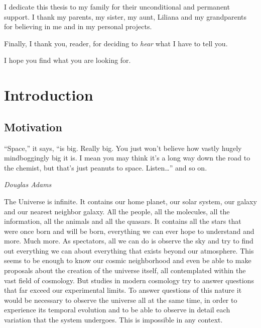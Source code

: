 \begin{titlepage}
 I dedicate this thesis to my family for their unconditional and permanent support. I thank my parents, my sister, my aunt, Liliana and my grandparents for believing in me and in my personal projects.
 
 \vspace{1cm}
 
Finally, I thank you, reader, for deciding to \textit{hear} what I have to tell you.

I hope you find what you are looking for.

\newpage

\tableofcontents
\end{titlepage}







\newpage
\section{Introduction}
\subsection{Motivation}


\epigraph{ “Space,” it says, “is big. Really big. You just won’t believe how vastly hugely
mindboggingly big it is. I mean you may think it’s a long way down the road to the
chemist, but that’s just peanuts to space. Listen…” and so on.}{\textit{Douglas Adams} \\ }

The Universe is infinite. It contains our home planet, our solar system, our galaxy and our nearest neighbor galaxy. All the people, all the molecules, all the information, all the animals and all the quasars. It contains all the stars that were once born and will be born, everything we can ever hope to understand and more. Much more.
As spectators, all we can do is observe the sky and try to find out everything we can about everything that exists beyond our atmosphere. This seems to be enough to know our cosmic neighborhood and even be able to make proposals about the creation of the universe itself, all contemplated within the vast field of cosmology. But studies in modern cosmology try to answer questions that far exceed our experimental limits. To answer questions of this nature it would be necessary to observe the universe all at the same time, in order to experience its temporal evolution and to be able to observe in detail each variation that the system undergoes. This is impossible in any context.\\


